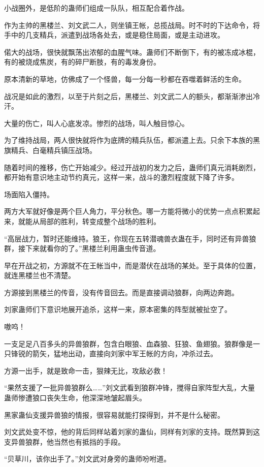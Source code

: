 \begin{this_body}
小战圈外，是低阶的蛊师们组成一队队，相互配合着作战。

作为主帅的黑楼兰、刘文武二人，则坐镇王帐，总揽战局。时不时的下达命令，将手中的几支精兵，派遣到战场各处去，或是稳住局面，或是主动进攻。

偌大的战场，很快就飘荡出浓郁的血腥气味。蛊师们不断倒下，有的被冻成冰棍，有的被烧成焦炭，有的碎尸断肢，有的毒发身份。

原本清新的草地，仿佛成了一个怪兽，每一分每一秒都在吞噬着鲜活的生命。

战况是如此的激烈，以至于片刻之后，黑楼兰、刘文武二人的额头，都渐渐渗出冷汗。

大量的伤亡，叫人心底发凉。惨烈的战场，叫人触目惊心。

为了维持战局，两人很快就将作为底牌的精兵队伍，都派遣上去。只余下本族的黑旗精兵、白毫精兵镇压战场。

随着时间的推移，伤亡开始减少。经过开战初的发力之后，蛊师们真元消耗剧烈，都开始有意识地主动节约真元，这样一来，战斗的激烈程度就下降了许多。

场面陷入僵持。

两方大军就好像是两个巨人角力，平分秋色。哪一方能将微小的优势一点点积累起来，就能从局部的胜利，转变成整个战场的胜利。

“高层战力，暂时还能维持。狼王，你现在五转潜魂兽衣蛊在手，同时还有异兽狼群，接下来就看你的了。”黑楼兰利用蛊虫传音道。

早在开战之初，方源就不在王帐当中，而是潜伏在战场的某处。至于具体的位置，就连黑楼兰也不清楚。

方源接到黑楼兰的传音，没有传音回去。而是直接调动狼群，向两边奔跑。

刘家蛊师们下意识地展开追杀，这样一来，原本密集的阵型就被扯空了。

嗷呜！

一支足足八百多头的异兽狼群，包含白眼狼、血森狼、狂狼、鱼翅狼。狼群像是一只锋锐的箭矢，猛地出动，直接向刘家中军王帐的方向，冲杀过去。

方源一出手，就是致命一击，狠辣无比，攻敌必救！

“果然支援了一批异兽狼群么……”刘文武看到狼群冲锋，搅得自家阵型大乱，大量蛊师惨遭狼口丧失生命，他深深地皱起眉头。

黑家蛊仙支援异兽狼的情报，很容易就能打探得到，并不是什么秘密。

刘文武处变不惊，他的背后同样站着刘家的蛊仙，同样有刘家的支持。既然算到这支异兽狼群，他当然也有抵挡的手段。

“贝草川，该你出手了。”刘文武对身旁的蛊师吩咐道。


\end{this_body}
